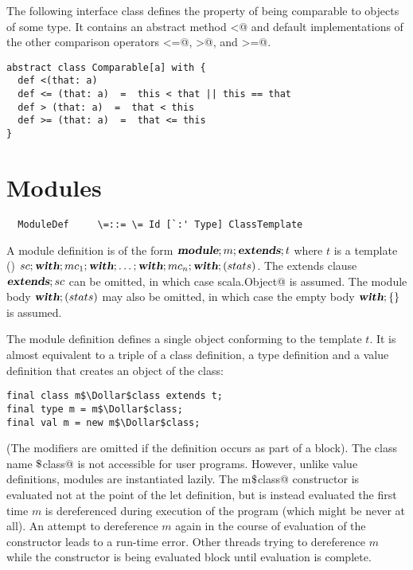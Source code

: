 \documentclass[11pt]{report}
\begin{document}
\begin{itemize}
\example\label{ex:comparable}
The following interface class defines the property of being
comparable to objects of some type. It contains an abstract method
\verb@<@ and default implementations of the other comparison operators
\verb@<=@, \verb@>@, and \verb@>=@.

\begin{verbatim}
abstract class Comparable[a] with {
  def <(that: a)
  def <= (that: a)  =  this < that || this == that
  def > (that: a)  =  that < this
  def >= (that: a)  =  that <= this
}
\end{verbatim}

\section{Modules}
\label{sec:modules}

\syntax\begin{verbatim}
  ModuleDef     \=::= \= Id [`:' Type] ClassTemplate
\end{verbatim}

A module definition is of the form $\mbox{\sl\bfseries module};m;\mbox{\sl\bfseries extends};t$ where $t$ is
a template ()
$sc;\mbox{\sl\bfseries with};mc_1;\mbox{\sl\bfseries with};\ldots;\mbox{\sl\bfseries with};mc_n;\mbox{\sl\bfseries with};(stats)$.  The extends
clause $\mbox{\sl\bfseries extends};sc$ can be omitted, in which case
\verb@extends scala.Object@ is assumed.
The module body $\mbox{\sl\bfseries with};(stats)$ may also be omitted, in which case the
empty body $\mbox{\sl\bfseries with};\{\}$ is assumed.

The module definition defines a single object conforming to the
template $t$.  It is almost equivalent to a triple of a class
definition,
a type definition and a value definition that creates an object of the class:
\begin{verbatim}
final class m$\Dollar$class extends t;
final type m = m$\Dollar$class;
final val m = new m$\Dollar$class;
\end{verbatim}
(The \verb@final@ modifiers are omitted if the definition occurs as
part of a block).  The class name \verb@m$\Dollar$class@ is not
accessible for user programs.
However, unlike value definitions, modules are instantiated lazily.
The \verb@new m$\Dollar$class@ constructor is evaluated not at the
point of the let definition, but is instead evaluated the first time
$m$ is dereferenced during execution of the program (which might be
never at all). An attempt to dereference $m$ again in the course of
evaluation of the constructor leads to a run-time error.  Other
threads trying to dereference $m$ while the constructor is being
evaluated block until evaluation is complete.


\end{itemize}
\end{document}
